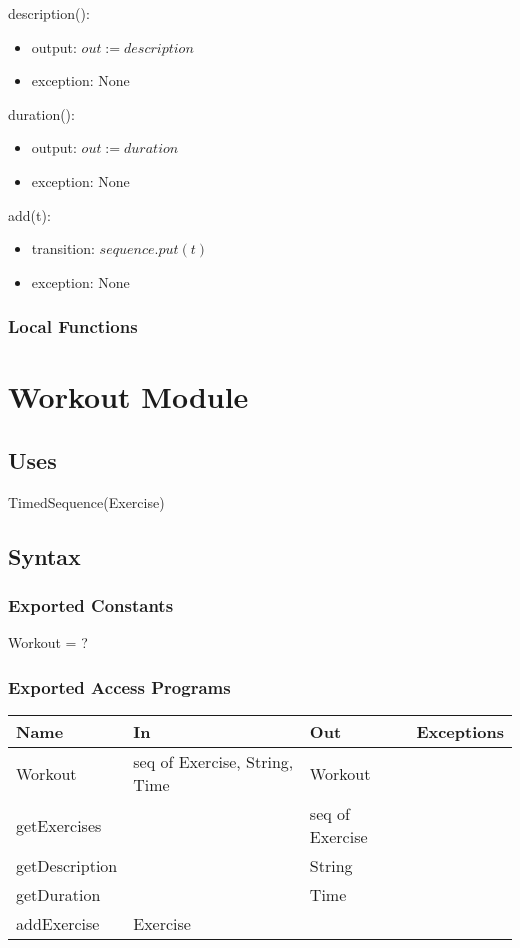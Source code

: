 \documentclass[12pt, titlepage]{article}
\begin{document}
description():
\begin{itemize}
	\item output: $out := description$
	\item exception: None
\end{itemize}

duration():
\begin{itemize}
	\item output: $out := duration$
	\item exception: None
\end{itemize}

add(t):
\begin{itemize}
	\item transition: $sequence.put(t)$
	\item exception: None
\end{itemize}

\subsubsection{Local Functions}

\newpage

\section{Workout Module}

\subsection{Uses}
TimedSequence(Exercise)
\subsection{Syntax}

\subsubsection{Exported Constants}
Workout = ?
\subsubsection{Exported Access Programs}

\begin{center}
	\begin{tabular}{p{2cm} p{4cm} p{4cm} p{2cm}}
		\hline
		\textbf{Name} & \textbf{In} & \textbf{Out} & \textbf{Exceptions} \\
		\hline
		Workout & seq of Exercise, String, Time & Workout &  \\
		getExercises &  & seq of Exercise &  \\
		getDescription &  & String &  \\
		getDuration &  & Time &  \\
		addExercise & Exercise & &  \\
		\hline
	\end{tabular}
\end{center}
\end{document}
